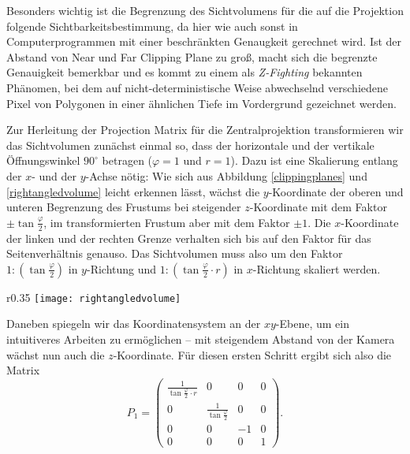 Besonders wichtig ist die Begrenzung des Sichtvolumens für die auf die Projektion folgende Sichtbarkeitsbestimmung, da hier wie auch sonst in Computerprogrammen mit einer beschränkten Genaugkeit gerechnet wird. Ist der Abstand von Near und Far Clipping Plane zu groß, macht sich die begrenzte Genauigkeit bemerkbar und es kommt zu einem als \emph{Z-Fighting} bekannten Phänomen, bei dem auf nicht-deterministische Weise abwechselnd verschiedene Pixel von Polygonen in einer ähnlichen Tiefe im Vordergrund gezeichnet werden.

Zur Herleitung der Projection Matrix für die Zentralprojektion transformieren wir das Sichtvolumen zunächst einmal so, dass der horizontale und der vertikale Öffnungswinkel $90^\circ$ betragen ($\varphi = 1$ und $r = 1$). Dazu ist eine Skalierung entlang der $x$- und der $y$-Achse nötig: Wie sich aus Abbildung \ref{clippingplanes} und \ref{rightangledvolume} leicht erkennen lässt, wächst die $y$-Koordinate der oberen und unteren Begrenzung des Frustums bei steigender $z$-Koordinate mit dem Faktor $\pm \tan\frac{\varphi}{2}$, im transformierten Frustum aber mit dem Faktor $\pm 1$. Die $x$-Koordinate der linken und der rechten Grenze verhalten sich bis auf den Faktor für das Seitenverhältnis genauso. Das Sichtvolumen muss also um den Faktor $1 : (\tan\frac{\varphi}{2})$ in $y$-Richtung und $1 : (\tan\frac{\varphi}{2} \cdot r)$ in $x$-Richtung skaliert werden.

\begin{wrapfigure}{r}{0.35\textwidth}
  \texttt{[image: rightangledvolume]}
  \caption{Rechtwinkliges Sichtvolumen mit Projektion auf die Ebene $z=1$.}
  \label{rightangledvolume}
\end{wrapfigure}

Daneben spiegeln wir das Koordinatensystem an der $xy$-Ebene, um ein intuitiveres Arbeiten zu ermöglichen -- mit steigendem Abstand von der Kamera wächst nun auch die $z$-Koordinate. Für diesen ersten Schritt ergibt sich also die Matrix
\begin{equation}
 P_1 = \begin{pmatrix}
  \frac{1}{\tan\frac{\varphi}{2} \cdot r} & 0 & 0 & 0 \\
  0 & \frac{1}{\tan\frac{\varphi}{2}} & 0 & 0 \\
  0 & 0 & -1 & 0 \\
  0 & 0 & 0 & 1
 \end{pmatrix}.
\end{equation}

